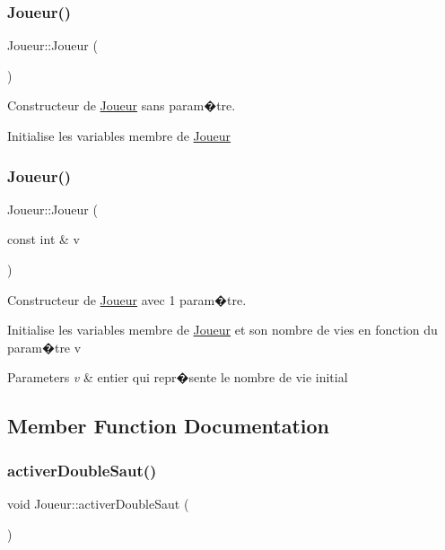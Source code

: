 \subsubsection{\texorpdfstring{Joueur()}{Joueur()}\hspace{0.1cm}{\footnotesize\ttfamily [1/2]}}
{\footnotesize\ttfamily Joueur\+::\+Joueur (\begin{DoxyParamCaption}{ }\end{DoxyParamCaption})}



Constructeur de \hyperlink{classJoueur}{Joueur} sans param�tre. 

Initialise les variables membre de \hyperlink{classJoueur}{Joueur} \mbox{\label{classJoueur_a8a04b26540b867954b0c97710cf64213}} 
\subsubsection{\texorpdfstring{Joueur()}{Joueur()}\hspace{0.1cm}{\footnotesize\ttfamily [2/2]}}
{\footnotesize\ttfamily Joueur\+::\+Joueur (\begin{DoxyParamCaption}\item[{const int \&}]{v }\end{DoxyParamCaption})}



Constructeur de \hyperlink{classJoueur}{Joueur} avec 1 param�tre. 

Initialise les variables membre de \hyperlink{classJoueur}{Joueur} et son nombre de vies en fonction du param�tre v 
\begin{DoxyParams}{Parameters}
{\em v} & entier qui repr�sente le nombre de vie initial \\
\hline
\end{DoxyParams}


\subsection{Member Function Documentation}
\mbox{\label{classJoueur_af36c9e420b2870efdb60d5571465540d}} 
\subsubsection{\texorpdfstring{activer\+Double\+Saut()}{activerDoubleSaut()}}
{\footnotesize\ttfamily void Joueur\+::activer\+Double\+Saut (\begin{DoxyParamCaption}{ }\end{DoxyParamCaption})}



